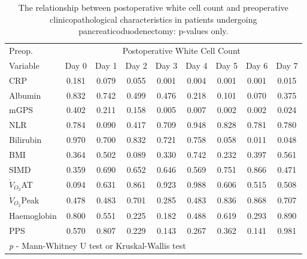 \begin{table}[p]
	\caption{The relationship  between postoperative white cell count and preoperative clinicopathological characteristics in patients undergoing pancreaticoduodenectomy: p-values only. }
	\label{table:sirs_wcc_pvalues}
	\footnotesize
	\centering
	\renewcommand{\arraystretch}{1.2} %

	\begin{tabular}{|l | c c c c c c c c|}
		\hline
		Preop.              &      \multicolumn{8}{c|}{Postoperative White Cell Count}      \\
		Variable            & Day 0 & Day 1 & Day 2 & Day 3 & Day 4 & Day 5 & Day 6 & Day 7 \\ \hline
		CRP                 & 0.181 & 0.079 & 0.055 & 0.001 & 0.004 & 0.001 & 0.001 & 0.015 \\
		Albumin             & 0.832 & 0.742 & 0.499 & 0.476 & 0.218 & 0.101 & 0.070 & 0.375 \\
		mGPS                & 0.402 & 0.211 & 0.158 & 0.005 & 0.007 & 0.002 & 0.002 & 0.024 \\
		NLR                 & 0.784 & 0.090 & 0.417 & 0.709 & 0.948 & 0.828 & 0.781 & 0.780 \\
		Bilirubin           & 0.970 & 0.700 & 0.832 & 0.721 & 0.758 & 0.058 & 0.011 & 0.048 \\
		BMI                 & 0.364 & 0.502 & 0.089 & 0.330 & 0.742 & 0.232 & 0.397 & 0.561 \\
		SIMD                & 0.359 & 0.690 & 0.652 & 0.646 & 0.569 & 0.751 & 0.866 & 0.471 \\
		$\dot{V}_{O_2}$AT   & 0.094 & 0.631 & 0.861 & 0.923 & 0.988 & 0.606 & 0.515 & 0.508 \\
		$\dot{V}_{O_2}$Peak & 0.478 & 0.483 & 0.701 & 0.285 & 0.483 & 0.836 & 0.868 & 0.707 \\
		Haemoglobin         & 0.800 & 0.551 & 0.225 & 0.182 & 0.488 & 0.619 & 0.293 & 0.890 \\
		PPS                 & 0.570 & 0.807 & 0.229 & 0.143 & 0.267 & 0.362 & 0.141 & 0.981 \\ \hline
		\multicolumn{9}{l}{\textit{p} - Mann-Whitney U test or Kruskal-Wallis test}
	\end{tabular}	
	\vspace{1cm}
\end{table}